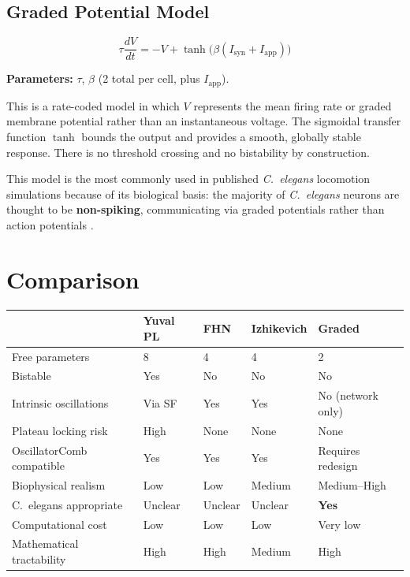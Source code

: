 \documentclass[11pt]{article}
\begin{document}
\subsection{Graded Potential Model}

\begin{equation}
    \tau \frac{dV}{dt} = -V + \tanh\!\bigl(\beta (I_{\mathrm{syn}} + I_{\mathrm{app}})\bigr)
    \label{eq:graded}
\end{equation}

\textbf{Parameters:} $\tau$, $\beta$ (2 total per cell, plus $I_{\mathrm{app}}$).

This is a rate-coded model in which $V$ represents the mean firing rate or graded membrane
potential rather than an instantaneous voltage. The sigmoidal transfer function $\tanh$ bounds
the output and provides a smooth, globally stable response. There is no threshold crossing
and no bistability by construction.

This model is the most commonly used in published \textit{C.~elegans} locomotion simulations
\cite{karbowski2008, izquierdo2013, olivares2021} because of its biological basis: the
majority of \textit{C.~elegans} neurons are thought to be \textbf{non-spiking}, communicating
via graded potentials rather than action potentials \cite{goodman1998}.

\section{Comparison}

\begin{center}
\renewcommand{\arraystretch}{1.4}
\begin{tabular}{p{3.8cm} p{2.2cm} p{2.2cm} p{2.2cm} p{2.2cm}}
\toprule
& \textbf{Yuval PL} & \textbf{FHN} & \textbf{Izhikevich} & \textbf{Graded} \\
\midrule
Free parameters        & 8        & 4         & 4          & 2 \\
Bistable               & Yes      & No        & No         & No \\
Intrinsic oscillations & Via SF   & Yes       & Yes        & No (network only) \\
Plateau locking risk   & High     & None      & None       & None \\
OscillatorComb compatible & Yes  & Yes       & Yes        & Requires redesign \\
Biophysical realism    & Low      & Low       & Medium     & Medium--High \\
C.\ elegans appropriate & Unclear & Unclear   & Unclear    & \textbf{Yes} \\
Computational cost     & Low      & Low       & Low        & Very low \\
Mathematical tractability & High  & High      & Medium     & High \\
\bottomrule
\end{tabular}
\end{center}
\end{document}
